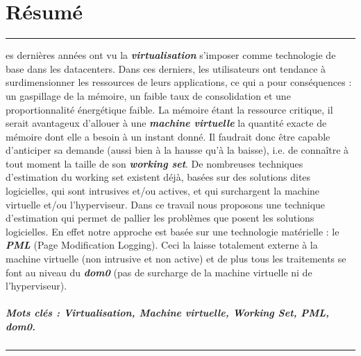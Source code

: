 %
%
%

\chapter*{Résumé}
{
\noindent\rule[3pt]{\textwidth}{1pt}
\vspace{.2cm}

es dernières années ont vu la \textbf{\emph{virtualisation}} s'imposer comme technologie de base dans les datacenters. Dans ces derniers, les utilisateurs ont tendance à surdimensionner les ressources de leurs applications, ce qui a pour conséquences : un gaspillage de la mémoire, un faible taux de consolidation et une proportionnalité énergétique faible. La mémoire étant la ressource critique, il serait avantageux d’allouer à une \textbf{\emph{machine virtuelle}} la quantité exacte de mémoire dont elle a besoin à un instant donné. Il faudrait donc être capable d’anticiper sa demande (aussi bien à la hausse qu’à la baisse), i.e. de connaître à tout moment la taille de son \textbf{\emph{working set}}. De nombreuses techniques d'estimation du working set existent déjà, basées sur des solutions dites logicielles, qui sont intrusives et/ou actives, et qui surchargent la machine virtuelle et/ou l'hyperviseur. Dans ce travail nous proposons une technique d'estimation qui permet de pallier les problèmes que posent les solutions logicielles. En effet notre approche est basée sur une technologie matérielle : le \textbf{\emph{PML}} (Page Modification Logging). Ceci la laisse totalement externe à la machine virtuelle (non intrusive et non active) et de plus tous les traitements se font au niveau du \textbf{\emph{dom0}} (pas de surcharge de la machine virtuelle ni de l'hyperviseur). 

\paragraph{Mots clés : Virtualisation, Machine virtuelle, Working Set, PML, dom0.}

\vspace{.2cm}
\noindent\rule[3pt]{\textwidth}{1pt}
}
\clearpage